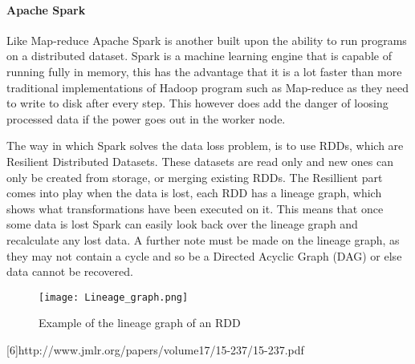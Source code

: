 \paragraph{Apache Spark}
Like Map-reduce Apache Spark is another built upon the ability to run programs
on a distributed dataset. Spark is a machine learning engine that is capable of
running fully in memory\cite{Sparkwebsite}, this has the advantage that it is a lot faster than
more traditional implementations of Hadoop program such as Map-reduce as they need
to write to disk after every step. This however does add the danger of loosing processed data
 if the power goes out in the worker node.

The way in which Spark solves the data loss problem, is to use RDDs, which are
Resilient Distributed Datasets. These datasets are read only and new ones can
only be created from storage, or merging existing RDDs\cite{Zaha12}. The Resillient part comes
into play when the data is lost, each RDD has a lineage graph, which shows what
transformations have been executed on it. This means that once some data is lost
Spark can easily look back over the lineage graph and recalculate any lost data.
A further note must be made on the lineage graph, as they may not contain a cycle
and so be a Directed Acyclic Graph (DAG) or else data cannot be recovered.

\begin{figure}
  \begin{center}
    \texttt{[image: Lineage\_graph.png]}
  \end{center}
  \caption{Example of the lineage graph of an RDD\cite{Zaha12}}
  \label{lineagegraph}
\end{figure}




[6]http://www.jmlr.org/papers/volume17/15-237/15-237.pdf %
